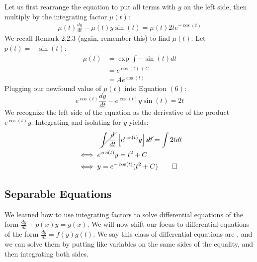\begin{solution}
    Let us first rearrange the equation to put all terms with $y$ on the left side, then multiply by the integrating factor $\mu(t)$:
    \begin{align}
        \mu(t)\frac{dy}{dt} - \mu(t)y\sin(t) = \mu(t)2te^{-\cos(t)}
    \end{align}
    We recall Remark 2.2.3 (again, remember this) to find $\mu(t)$. Let $p(t) = -\sin(t)$:
    \begin{align*}
        \mu(t) &= \exp \int -\sin(t) dt \\
        &= e^{\cos(t) + C} \\
        &= Ae^{\cos(t)}
    \end{align*}
    Plugging our newfound value of $\mu(t)$ into Equation $(6)$:
    \[ e^{\cos(t)}\frac{dy}{dt} - e^{\cos(t)}y\sin(t) = 2t \]
    We recognize the left side of the equation as the derivative of the product $e^{\cos(t)}y$. Integrating and isolating for $y$ yields:
    \begin{align*}
        &\hspace{1.2cm} \cancel{\int \frac{d}{dt}}\left[e^{\cos(t)}y\right] \cancel{dt} = \int 2t dt\\
        &\iff e^{\cos(t)}y = t^2 + C \\
        &\iff y = e^{-\cos(t)}(t^2 + C) \qedhere
    \end{align*}
\end{solution}

\subsection{Separable Equations}

We learned how to use integrating factors to solve differential equations of the form $\frac{dy}{dt} + p(x)y = g(x)$. We will now shift our focus to differential equations of the form $\frac{dy}{dt} = f(y)g(t)$. We say this class of differential equations are , and we can solve them by putting like variables on the same sides of the equality, and then integrating both sides.

